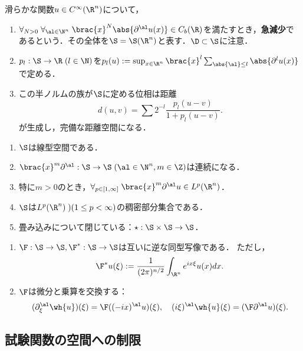 \documentclass[uplatex, dvipdfmx]{jsreport}
\begin{document}
\begin{definition}
    滑らかな関数$u\in C^\infty(\R^n)$について，
    \begin{enumerate}
        \item $\forall_{N>0}\;\forall_{\al\in\N^n}\;\brac{x}^N\abs{\partial^\al u(x)}\in C_b(\R)$を満たすとき，\textbf{急減少}であるという．その全体を$\S=\S(\R^n)$と表す．$\D\subset\S$に注意．
        \item $p_l:\S\to\R\;(l\in\N)$を$p_l(u):=\sup_{x\in\R^n}\brac{x}^l\sum_{\abs{\al}\le l}\abs{\partial^lu(x)}$で定める．
        \item この半ノルムの族が$\S$に定める位相は距離
        \[d(u,v)=\sum 2^{-l}\frac{p_l(u-v)}{1+p_l(u-v)}.\]
        が生成し，完備な距離空間になる．
    \end{enumerate}
\end{definition}

\begin{proposition}\mbox{}
    \begin{enumerate}
        \item $\S$は線型空間である．
        \item $\brac{x}^m\partial^\al:\S\to\S\;(\al\in\N^n,m\in\Z)$は連続になる．
        \item 特に$m>0$のとき，$\forall_{p\in[1,\infty]}\;\brac{x}^m\partial^\al u\in L^p(\R^n)$．
        \item $\S$は$L^p(\R^n)\;)(1\le p<\infty)$の稠密部分集合である．
        \item 畳み込みについて閉じている：$\star:\S\times\S\to\S$．
    \end{enumerate}
\end{proposition}

\begin{theorem}\mbox{}
    \begin{enumerate}
        \item $\F:\S\to\S,\F^*:\S\to\S$は互いに逆な同型写像である．
        ただし，
        \[\F^*u(\xi):=\frac{1}{(2\pi)^{n/2}}\int_{\R^n}e^{ix\xi}u(x)dx.\]
        \item $\F$は微分と乗算を交換する：
        \[(\partial^\al_\xi\wh{u})(\xi)=\F((-ix)^\al u)(\xi),\quad(i\xi)^\al\wh{u}(\xi)=(\F\partial^\al u)(\xi).\]
    \end{enumerate}
\end{theorem}

\subsection{試験関数の空間への制限}
\end{document}
